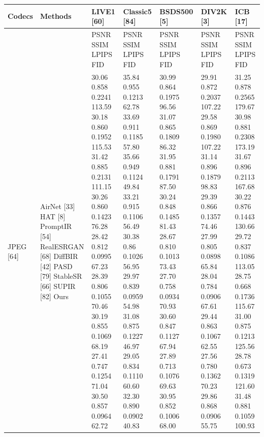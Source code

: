 \begin{tabular}{lllllll}
\toprule
Codecs & Methods & LIVE1 [60] & Classic5 [84] & BSDS500 [5] & DIV2K [3] & ICB [17] \\
\midrule
 &  & PSNR SSIM LPIPS FID & PSNR SSIM LPIPS FID & PSNR SSIM LPIPS FID & PSNR SSIM LPIPS FID & PSNR SSIM LPIPS FID \\
JPEG [64] & AirNet [33] HAT [8] PromptIR [54] RealESRGAN [68] DiffBIR [42] PASD [79] StableSR [66] SUPIR [82] Ours & 30.06 0.858 0.2241 113.59 30.18 0.860 0.1952 115.53 31.42 0.885 0.2131 111.15 30.26 0.860 0.1423 76.28 28.42 0.812 0.0995 67.23 28.39 0.806 0.1055 70.46 30.19 0.855 0.1069 68.19 27.41 0.747 0.1254 71.04 30.50 0.857 0.0964 62.72 & 35.84 0.955 0.1213 62.78 33.69 0.911 0.1185 57.80 35.66 0.949 0.1124 49.84 33.21 0.915 0.1106 56.49 30.38 0.86 0.1026 56.95 29.97 0.839 0.0959 54.98 31.08 0.875 0.1227 46.97 29.05 0.834 0.1110 60.60 32.30 0.890 0.0902 40.83 & 30.99 0.864 0.1975 96.56 31.07 0.865 0.1809 86.32 31.95 0.881 0.1791 87.50 30.24 0.848 0.1485 81.43 28.67 0.810 0.1013 73.43 27.70 0.758 0.0934 70.93 30.60 0.847 0.1127 67.94 27.89 0.713 0.1076 69.63 30.95 0.852 0.1006 68.00 & 29.91 0.872 0.2037 107.22 29.58 0.869 0.1980 107.22 31.14 0.896 0.1879 98.83 29.39 0.866 0.1357 74.46 27.99 0.805 0.0898 65.84 28.04 0.784 0.0906 67.61 29.44 0.863 0.1067 62.55 27.56 0.780 0.1362 70.23 29.86 0.868 0.0906 55.75 & 31.25 0.878 0.2565 179.67 30.98 0.881 0.2308 173.19 31.67 0.896 0.2113 167.68 30.22 0.876 0.1443 130.66 29.72 0.837 0.1086 113.05 28.75 0.668 0.1736 115.67 31.00 0.875 0.1213 125.56 28.78 0.673 0.1319 121.60 31.48 0.881 0.1059 100.93 \\

\end{tabular}
